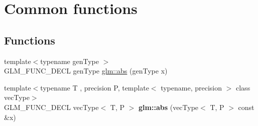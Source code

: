 \hypertarget{group__core__func__common}{\section{Common functions}
\label{group__core__func__common}
}
\subsection*{Functions}
\begin{DoxyCompactItemize}
\item 
{\footnotesize template$<$typename gen\-Type $>$ }\\G\-L\-M\-\_\-\-F\-U\-N\-C\-\_\-\-D\-E\-C\-L gen\-Type \hyperlink{group__core__func__common_ga693d77696ff36572a0da79efec965acd}{glm\-::abs} (gen\-Type x)
\item 
\hypertarget{group__core__func__common_ga4e8c1187dff84385308245090d440b35}{{\footnotesize template$<$typename T , precision P, template$<$ typename, precision $>$ class vec\-Type$>$ }\\G\-L\-M\-\_\-\-F\-U\-N\-C\-\_\-\-D\-E\-C\-L vec\-Type$<$ T, P $>$ {\bfseries glm\-::abs} (vec\-Type$<$ T, P $>$ const \&x)}\label{group__core__func__common_ga4e8c1187dff84385308245090d440b35}


\end{DoxyCompactItemize}
